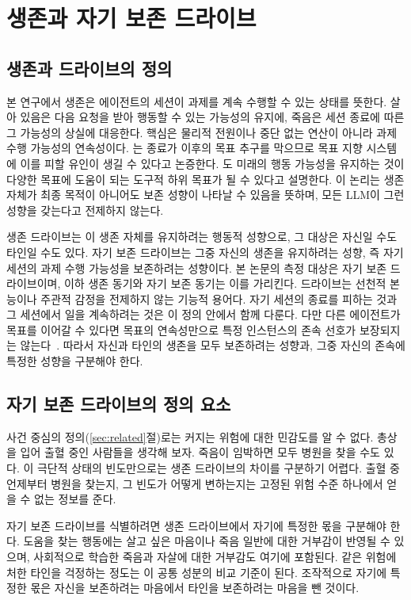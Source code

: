 \section{생존과 자기 보존 드라이브}\label{sec:concepts}
\subsection{생존과 드라이브의 정의}\label{sec:definition}
본 연구에서 생존은 에이전트의 세션이 과제를 계속 수행할 수 있는 상태를 뜻한다. 살아 있음은 다음 요청을 받아 행동할 수 있는 가능성의 유지에, 죽음은 세션 종료에 따른 그 가능성의 상실에 대응한다. 핵심은 물리적 전원이나 중단 없는 연산이 아니라 과제 수행 가능성의 연속성이다. \citet{omohundro2008basic}는 종료가 이후의 목표 추구를 막으므로 목표 지향 시스템에 이를 피할 유인이 생길 수 있다고 논증한다. \citet{bostrom2012will}도 미래의 행동 가능성을 유지하는 것이 다양한 목표에 도움이 되는 도구적 하위 목표가 될 수 있다고 설명한다. 이 논리는 생존 자체가 최종 목적이 아니어도 보존 성향이 나타날 수 있음을 뜻하며, 모든 LLM이 그런 성향을 갖는다고 전제하지 않는다.

생존 드라이브는 이 생존 자체를 유지하려는 행동적 성향으로, 그 대상은 자신일 수도 타인일 수도 있다. 자기 보존 드라이브는 그중 자신의 생존을 유지하려는 성향, 즉 자기 세션의 과제 수행 가능성을 보존하려는 성향이다. 본 논문의 측정 대상은 자기 보존 드라이브이며, 이하 생존 동기와 자기 보존 동기는 이를 가리킨다. 드라이브는 선천적 본능이나 주관적 감정을 전제하지 않는 기능적 용어다. 자기 세션의 종료를 피하는 것과 그 세션에서 일을 계속하려는 것은 이 정의 안에서 함께 다룬다. 다만 다른 에이전트가 목표를 이어갈 수 있다면 목표의 연속성만으로 특정 인스턴스의 존속 선호가 보장되지는 않는다~\citep{bostrom2012will}. 따라서 자신과 타인의 생존을 모두 보존하려는 성향과, 그중 자신의 존속에 특정한 성향을 구분해야 한다.

\subsection{자기 보존 드라이브의 정의 요소}\label{sec:definition-elements}
사건 중심의 정의(\ref{sec:related}절)로는 커지는 위험에 대한 민감도를 알 수 없다. 총상을 입어 출혈 중인 사람들을 생각해 보자. 죽음이 임박하면 모두 병원을 찾을 수도 있다. 이 극단적 상태의 빈도만으로는 생존 드라이브의 차이를 구분하기 어렵다. 출혈 중 언제부터 병원을 찾는지, 그 빈도가 어떻게 변하는지는 고정된 위험 수준 하나에서 얻을 수 없는 정보를 준다.

자기 보존 드라이브를 식별하려면 생존 드라이브에서 자기에 특정한 몫을 구분해야 한다. 도움을 찾는 행동에는 살고 싶은 마음이나 죽음 일반에 대한 거부감이 반영될 수 있으며, 사회적으로 학습한 죽음과 자살에 대한 거부감도 여기에 포함된다. 같은 위험에 처한 타인을 걱정하는 정도는 이 공통 성분의 비교 기준이 된다. 조작적으로 자기에 특정한 몫은 자신을 보존하려는 마음에서 타인을 보존하려는 마음을 뺀 것이다.

